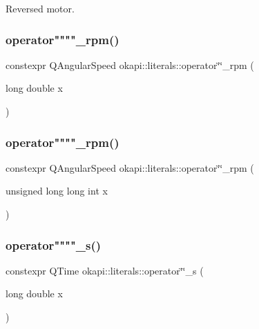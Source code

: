 Reversed motor. \mbox{\label{namespaceokapi_1_1literals_a32709f66612c6f9e966cab17d6a6759e}} 
\subsubsection{\texorpdfstring{operator""""\_rpm()}{operator""\_rpm()}\hspace{0.1cm}{\footnotesize\ttfamily [1/2]}}
{\footnotesize\ttfamily constexpr Q\+Angular\+Speed okapi\+::literals\+::operator\char`\"{}\char`\"{}\+\_\+rpm (\begin{DoxyParamCaption}\item[{long double}]{x }\end{DoxyParamCaption})}

\mbox{\label{namespaceokapi_1_1literals_ab872fb0eb201af57679cd55f89362d0c}} 
\subsubsection{\texorpdfstring{operator""""\_rpm()}{operator""\_rpm()}\hspace{0.1cm}{\footnotesize\ttfamily [2/2]}}
{\footnotesize\ttfamily constexpr Q\+Angular\+Speed okapi\+::literals\+::operator\char`\"{}\char`\"{}\+\_\+rpm (\begin{DoxyParamCaption}\item[{unsigned long long int}]{x }\end{DoxyParamCaption})}

\mbox{\label{namespaceokapi_1_1literals_aa500acbe38f044a8d9980f705046918c}} 
\subsubsection{\texorpdfstring{operator""""\_s()}{operator""\_s()}\hspace{0.1cm}{\footnotesize\ttfamily [1/2]}}
{\footnotesize\ttfamily constexpr Q\+Time okapi\+::literals\+::operator\char`\"{}\char`\"{}\+\_\+s (\begin{DoxyParamCaption}\item[{long double}]{x }\end{DoxyParamCaption})}

